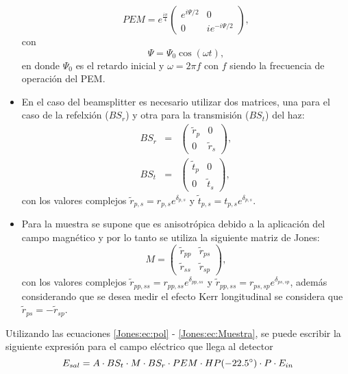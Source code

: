 \begin{itemize}
	\begin{equation}
	PEM= e^{\frac{i \pi}{4}}
	\begin{pmatrix}
	e^{i \Psi /2}&0\\
	0            &i e^{-i \Psi /2}
	\end{pmatrix},
	\label{Jones:ec:PEM}
	\end{equation}
	con 
	\begin{equation*}
	\Psi=\Psi_0 \cos(\omega t),
	\end{equation*}
	en donde $\Psi_0$ es el retardo inicial y $\omega=2 \pi f$ con $f$ siendo la frecuencia de operaci\'on del PEM.
	\item En el caso del beamsplitter es necesario utilizar dos matrices, una para el caso de la refelxi\'on ($BS_r$) y otra para la transmisi\'on ($BS_t$) del haz:
	\begin{eqnarray}
	BS_r&=&
	\begin{pmatrix}
	\tilde{r}_p &0 \\
	0   &\tilde{r}_s
	\end{pmatrix}, \label{Jones:ec:BSr} \\
	BS_t&=&
	\begin{pmatrix}
	\tilde{t}_p &0 \\
	0   &\tilde{t}_s
	\end{pmatrix}, \label{Jones:ec:BSt}
	\end{eqnarray}
	con los valores complejos $\tilde{r}_{p,s} = r_{p,s} e^{\delta_{p,s}}$ y $\tilde{t}_{p,s} = t_{p,s} e^{\delta_{p,s}}$.
	\item Para la muestra se supone que es anisotr\'opica debido a la aplicaci\'on del campo magn\'etico y por lo tanto  se utiliza la siguiente matriz de Jones:
	\begin{equation}
	M=
	\begin{pmatrix}
	\tilde{r}_{pp}&\tilde{r}_{ps}\\
	\tilde{r}_{ss}&\tilde{r}_{sp}
	\end{pmatrix},
	\label{Jones:ec:Muestra}
	\end{equation}
	con los valores complejos $\tilde{r}_{pp,ss} = r_{pp,ss} e^{\delta_{pp,ss}}$ y $\tilde{r}_{pp,ss} = r_{ps,sp} e^{\delta_{ps,sp}}$, adem\'as considerando que se desea medir el efecto Kerr longitudinal se considera que $\tilde{r}_{ps}=-\tilde{r}_{sp}$.
\end{itemize}
Utilizando las ecuaciones \ref{Jones:ec:pol} - \ref{Jones:ec:Muestra}, se puede escribir la siguiente expresi\'on  para el campo el\'ectrico que llega al detector
\begin{equation}
E_{sal} = A \cdot BS_t \cdot M \cdot BS_r \cdot PEM \cdot HP(-22.5 \degree) \cdot P \cdot E_{in} \label{Jones:ec:Esal} 
\end{equation}
